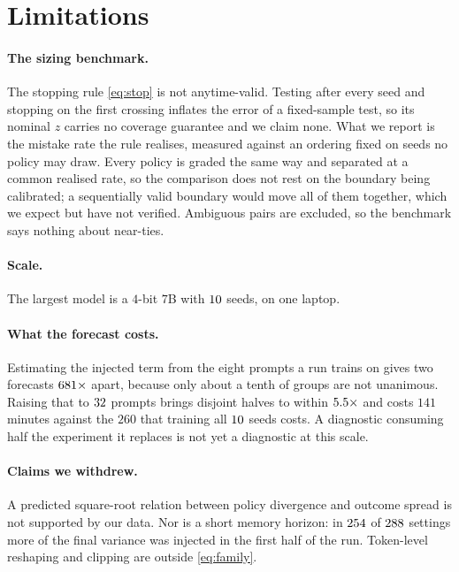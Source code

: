 \section{Limitations}
\label{sec:discussion}

\paragraph{The sizing benchmark.} The stopping rule \eqref{eq:stop} is not anytime-valid. Testing
after every seed and stopping on the first crossing inflates the error of a fixed-sample test, so
its nominal $z$ carries no coverage guarantee and we claim none. What we report is the mistake rate
the rule realises, measured against an ordering fixed on seeds no policy may draw. Every policy is
graded the same way and separated at a common realised rate, so the comparison does not rest on the
boundary being calibrated; a sequentially valid boundary would move all of them together, which we
expect but have not verified. Ambiguous pairs are excluded, so the benchmark says nothing about near-ties.

\paragraph{Scale.} The largest model is a $4$-bit $7$B with $10$ seeds, on one
laptop.

\paragraph{What the forecast costs.} Estimating the injected term from the eight prompts a run
trains on gives two forecasts $681\times$ apart, because only about a tenth of
groups are not unanimous. Raising that to $32$ prompts brings disjoint halves
to within $5.5\times$ and costs $141$ minutes against the $260$ that training
all $10$ seeds costs. A diagnostic consuming half the experiment it replaces is not
yet a diagnostic at this scale.

\paragraph{Claims we withdrew.} A predicted square-root relation between policy divergence and
outcome spread is not supported by our data. Nor is a short memory horizon: in $254$ of
$288$ settings more of the final variance was injected in the first half of the run.
Token-level reshaping and clipping are outside \eqref{eq:family}.
